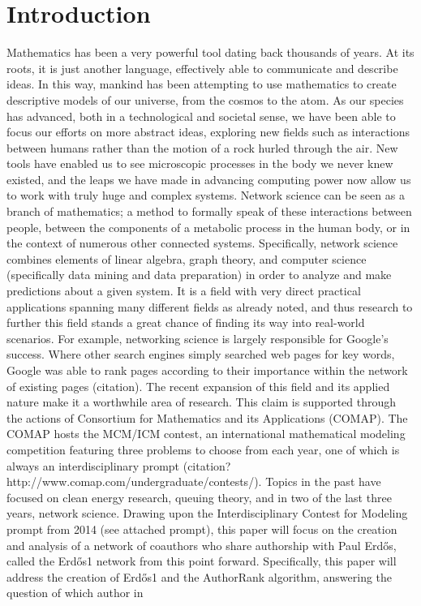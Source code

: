 \documentclass[17pt]{extarticle}
\begin{document}
\newpage

\tableofcontents

\newpage



\setcounter{page}{1}

\section{Introduction}

\indent \indent Mathematics has been a very powerful tool dating back thousands of years. At its roots, it is just another language, effectively able to communicate and describe ideas. In this way, mankind has been attempting to use mathematics to create descriptive models of our universe, from the cosmos to the atom. As our species has advanced, both in a technological and societal sense, we have been able to focus our efforts on more abstract ideas, exploring new fields such as interactions between humans rather than the motion of a rock hurled through the air. New tools have enabled us to see microscopic processes in the body we never knew existed, and the leaps we have made in advancing computing power now allow us to work with truly huge and complex systems. Network science can be seen as a branch of mathematics; a method to formally speak of these interactions between people, between the components of a metabolic process in the human body, or in the context of numerous other connected systems. Specifically, network science combines elements of linear algebra, graph theory, and computer science (specifically data mining and data preparation) in order to analyze and make predictions about a given system. It is a field with very direct practical applications spanning many different fields as already noted, and thus research to further this field stands a great chance of finding its way into real-world scenarios. For example, networking science is largely responsible for Google's success. Where other search engines simply searched web pages for key words, Google was able to rank pages according to their importance within the network of existing pages (citation). The recent expansion of this field and its applied nature make it a worthwhile area of research. This claim is supported through the actions of Consortium for Mathematics and its Applications (COMAP). The COMAP hosts the MCM/ICM contest, an international mathematical modeling competition featuring three problems to choose from each year, one of which is always an interdisciplinary prompt  (citation? http://www.comap.com/undergraduate/contests/). Topics in the past have focused on clean energy research, queuing theory, and in two of the last three years, network science. Drawing upon the Interdisciplinary Contest for Modeling prompt from 2014 (see attached prompt), this paper will focus on the creation and analysis of a network of coauthors who share authorship with Paul Erd\H{o}s, called the Erd\H{o}s1 network from this point forward. Specifically, this paper will address the creation of Erd\H{o}s1 and the AuthorRank algorithm, answering the question of which author in 
\end{document}
